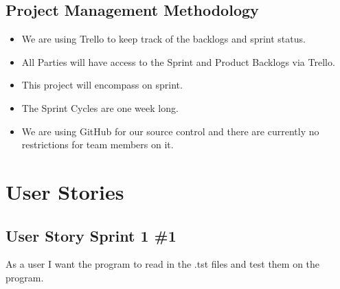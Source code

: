 \subsection{Project  Management Methodology}
 
\begin{itemize}
\item We are using Trello to keep track of the backlogs and sprint status.%
\item All Parties will have access to the Sprint and Product Backlogs via Trello.%
\item This project will encompass on sprint.%
\item The Sprint Cycles are one week long.%
\item We are using GitHub for our source control and there are currently no restrictions for team members on it.%
\end{itemize}

\section{User Stories}




\subsection{User Story Sprint 1 \#1}
As a user I want the program to read in the .tst files and test them on the program.


